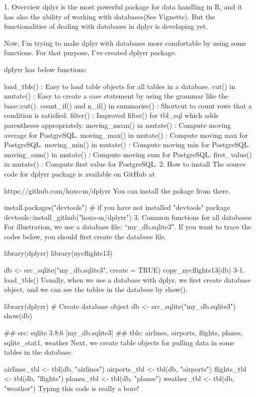 
1. Overview
dplyr is the most powerful package for data handling in R, and it has also the ability of working with databases(See Vignette). 
But the functionalities of dealing with databases in dplyr is developing yet.

Now, I’m trying to make dplyr with databases more comfortable by using some functions. 
For that purpose, I’ve created dplyrr package.

dplyrr has below functions:

load_tbls() : Easy to load table objects for all tables in a database.
cut() in mutate() : Easy to create a case statement by using the grammar like the base::cut().
count_if() and n_if() in summarise() : Shortcut to count rows that a condition is satisfied.
filter() : Improved filter() for tbl_sql which adds parentheses appropriately.
moving_mean() in mutate() : Compute moving average for PostgreSQL.
moving_max() in mutate() : Compute moving max for PostgreSQL.
moving_min() in mutate() : Compute moving min for PostgreSQL.
moving_sum() in mutate() : Compute moving sum for PostgreSQL.
first_value() in mutate() : Compute first value for PostgreSQL.
2. How to install
The source code for dplyrr package is available on GitHub at

https://github.com/hoxo-m/dplyrr
You can install the pakage from there.

install.packages("devtools") # if you have not installed "devtools" package
devtools::install_github("hoxo-m/dplyrr")
3. Common functions for all databases
For illustration, we use a database file: “my_db.sqlite3″. 
If you want to trace the codes below, you should first create the databese file.

library(dplyrr)
library(nycflights13)

db <- src_sqlite("my_db.sqlite3", create = TRUE)
copy_nycflights13(db)
3-1. load_tbls()
Usually, when we use a database with dplyr, we first create database object, and we can see the tables in the databese by show().

library(dplyrr)
# Create database object
db <- src_sqlite("my_db.sqlite3")
show(db)

## src:  sqlite 3.8.6 [my_db.sqlite3]
## tbls: airlines, airports, flights, planes, sqlite_stat1, weather
Next, we create table objects for pulling data in some tables in the database.

airlines_tbl <- tbl(db, "airlines")
airports_tbl <- tbl(db, "airports")
flights_tbl <- tbl(db, "flights")
planes_tbl <- tbl(db, "planes")
weather_tbl <- tbl(db, "weather")
Typing this code is really a bore!


